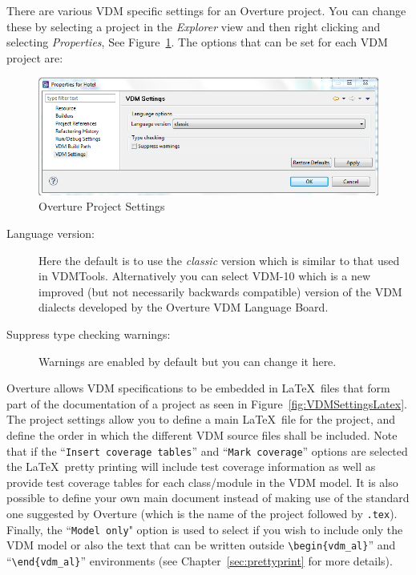 \documentclass{overturerepchap}
\begin{document}
There are various VDM
specific settings for an Overture project. You can change these by
selecting a project
in the \emph{Explorer} view and then right clicking and selecting
\emph{Properties}, See Figure~\ref{fig:VDMSettings}. The options
that can be set for each VDM project are:

\begin{figure}[!hbt]
\begin{center}
  \includegraphics[width=\textwidth]{screenDumps/projectsettings}
  \caption[Overture Project Settings]{Overture Project Settings}
  \label{fig:VDMSettings}
\end{center}
\end{figure}

\begin{description}
\item[Language version:] Here the default is to use the
  \emph{classic} version which is similar to that used in
  VDMTools. Alternatively you can select VDM-10 which
  is a new improved (but not necessarily backwards compatible) version of
  the VDM dialects developed by the Overture VDM Language Board.
\item[Suppress type checking warnings:] Warnings are enabled
  by default but you can change it here.
\end{description}

Overture allows VDM specifications to be embedded in \LaTeX\ files that
form part of the documentation of a project as seen in
Figure~\ref{fig:VDMSettingsLatex}. The project settings allow you
to define a main \LaTeX\ file for the project, and define the order in which the
different VDM source files shall be included. Note that if the
``\texttt{Insert coverage tables}'' and ``\texttt{Mark coverage}''
options are selected the \LaTeX\ pretty printing will include test
coverage information as well as provide test coverage tables for each
class/module in the VDM model. It is also possible to define your own
main document instead of making use of the standard one suggested by
Overture (which is the name of the project followed by \texttt{.tex}). 
Finally, the ``\texttt{Model only}" option is used to select if you 
wish to include only the VDM model or also the text that can be written
outside \verb+\begin{vdm_al}+'' and ``\verb+\end{vdm_al}+'' environments 
(see Chapter~\ref{sec:prettyprint} for more details).
\end{document}
